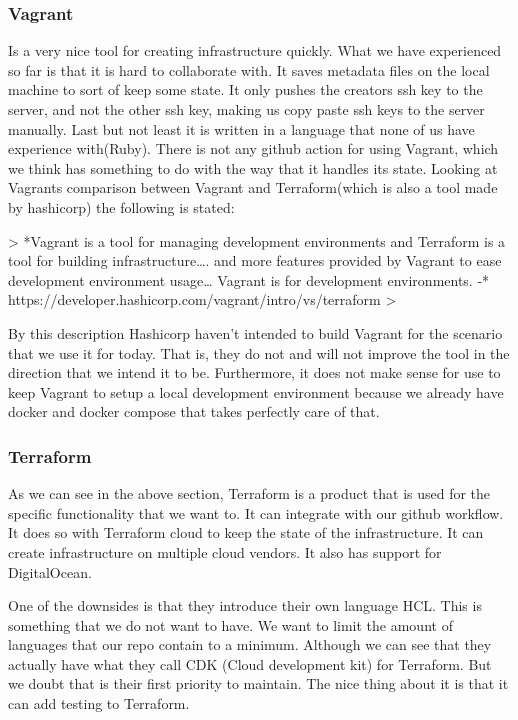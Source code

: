\subsubsection{Vagrant}

Is a very nice tool for creating infrastructure quickly. What we have experienced so far is that it is hard to collaborate with. It saves metadata files on the local machine to sort of keep some state. It only pushes the creators ssh key to the server, and not the other ssh key, making us copy paste ssh keys to the server manually. Last but not least it is written in a language that none of us have experience with(Ruby).
There is not any github action for using Vagrant, which we think has something to do with the way that it handles its state. Looking at Vagrants comparison between Vagrant and Terraform(which is also a tool made by hashicorp) the following is stated:

> *Vagrant is a tool for managing development environments and Terraform is a tool for building infrastructure…. and more features provided by Vagrant to ease development environment usage… Vagrant is for development environments.
-* https://developer.hashicorp.com/vagrant/intro/vs/terraform
>

By this description Hashicorp haven’t intended to build Vagrant for the scenario that we use it for today. That is, they do not and will not improve the tool in the direction that we intend it to be. Furthermore, it does not make sense for use to keep Vagrant to setup a local development environment because we already have docker and docker compose that takes perfectly care of that.

\subsubsection{Terraform}

As we can see in the above section, Terraform is a product that is used for the specific functionality that we want to. It can integrate with our github workflow. It does so with Terraform cloud to keep the state of the infrastructure. It can create infrastructure on multiple cloud vendors. It also has support for DigitalOcean.

One of the downsides is that they introduce their own language HCL. This is something that we do not want to have. We want to limit the amount of languages that our repo contain to a minimum. Although we can see that they actually have what they call CDK (Cloud development kit) for Terraform. But we doubt that is their first priority to maintain. The nice thing about it is that it can add testing to Terraform.

